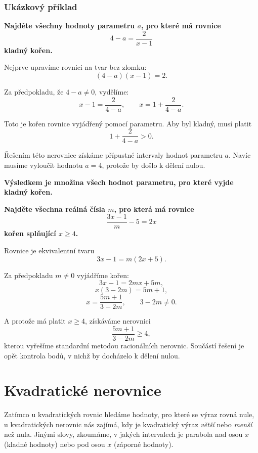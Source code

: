 \documentclass[12pt,a4paper]{article}
\begin{document}
\subsubsection*{Ukázkový příklad}

\begin{examplebox}
\textbf{Najděte všechny hodnoty parametru \(a\), pro které má rovnice}
\[
4 - a = \frac{2}{x - 1}
\]
\textbf{kladný kořen.}

Nejprve upravíme rovnici na tvar bez zlomku:
\[
(4 - a)(x - 1) = 2.
\]

Za předpokladu, že \(4 - a \neq 0\), vydělíme:
\[
x - 1 = \frac{2}{4 - a},
\qquad
x = 1 + \frac{2}{4 - a}.
\]

Toto je kořen rovnice vyjádřený pomocí parametru.  
Aby byl kladný, musí platit
\[
1 + \frac{2}{4 - a} > 0.
\]

Řešením této nerovnice získáme přípustné intervaly hodnot parametru \(a\).  
Navíc musíme vyloučit hodnotu \(a = 4\), protože by došlo k dělení nulou.

\textbf{Výsledkem je množina všech hodnot parametru, pro které vyjde kladný kořen.}
\end{examplebox}

\begin{examplebox}
\textbf{Najděte všechna reálná čísla \(m\), pro která má rovnice}
\[
\frac{3x - 1}{m} - 5 = 2x
\]
\textbf{kořen splňující \(x \ge 4\).}

Rovnice je ekvivalentní tvaru
\[
3x - 1 = m(2x + 5).
\]

Za předpokladu \(m \neq 0\) vyjádříme kořen:
\[
3x - 1 = 2mx + 5m,
\]
\[
x(3 - 2m) = 5m + 1,
\]
\[
x = \frac{5m + 1}{3 - 2m},
\qquad
3 - 2m \neq 0.
\]

A protože má platit \(x \ge 4\), získáváme nerovnici
\[
\frac{5m + 1}{3 - 2m} \ge 4,
\]
kterou vyřešíme standardní metodou racionálních nerovnic.  
Součástí řešení je opět kontrola bodů, v nichž by docházelo k dělení nulou.
\end{examplebox}





\section{Kvadratické nerovnice}

Zatímco u kvadratických rovnic hledáme hodnoty, pro které se výraz rovná nule,  
u kvadratických nerovnic nás zajímá, kdy je kvadratický výraz \textit{větší} nebo \textit{menší} než nula.  
Jinými slovy, zkoumáme, v jakých intervalech je parabola nad osou \(x\) (kladné hodnoty) nebo pod osou \(x\) (záporné hodnoty).
\end{document}
